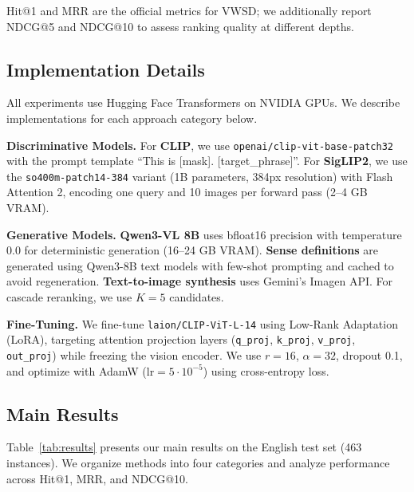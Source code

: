 \documentclass[11pt]{article}
\begin{document}
Hit@1 and MRR are the official metrics for VWSD; we additionally report NDCG@5 and NDCG@10 to assess ranking quality at different depths.

\subsection{Implementation Details}

All experiments use Hugging Face Transformers on NVIDIA GPUs. We describe implementations for each approach category below.

\textbf{Discriminative Models.} For \textbf{CLIP}, we use \texttt{openai/clip-vit-base-patch32} with the prompt template ``This is [mask]. [target\_phrase]''. For \textbf{SigLIP2}, we use the \texttt{so400m-patch14-384} variant (1B parameters, 384px resolution) with Flash Attention 2, encoding one query and 10 images per forward pass (2--4 GB VRAM).

\textbf{Generative Models.} \textbf{Qwen3-VL 8B} uses bfloat16 precision with temperature 0.0 for deterministic generation (16--24 GB VRAM). \textbf{Sense definitions} are generated using Qwen3-8B text models with few-shot prompting and cached to avoid regeneration. \textbf{Text-to-image synthesis} uses Gemini's Imagen API. For cascade reranking, we use $K=5$ candidates.

\textbf{Fine-Tuning.} We fine-tune \texttt{laion/CLIP-ViT-L-14} using Low-Rank Adaptation (LoRA), targeting attention projection layers (\texttt{q\_proj}, \texttt{k\_proj}, \texttt{v\_proj}, \texttt{out\_proj}) while freezing the vision encoder. We use $r=16$, $\alpha=32$, dropout 0.1, and optimize with AdamW (lr$=5\cdot 10^{-5}$) using cross-entropy loss.

\subsection{Main Results}

Table~\ref{tab:results} presents our main results on the English test set (463 instances). We organize methods into four categories and analyze performance across Hit@1, MRR, and NDCG@10.
\end{document}
